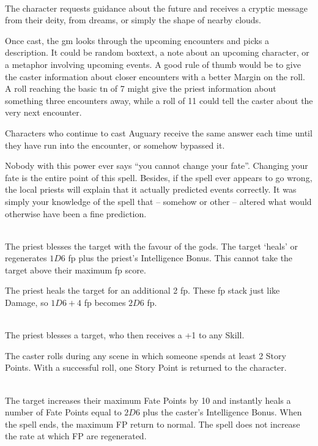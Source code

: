 \documentclass[titlepage,a4paper,openany]{book}
\begin{document}
\begin{multicols}{2}
\spelllevel

\\
The character requests guidance about the future and receives a cryptic message from their deity, from dreams, or simply the shape of nearby clouds.

Once cast, the \gls{gm} looks through the upcoming encounters and picks a description.  It could be random boxtext, a note about an upcoming character, or a metaphor involving upcoming events.  A good rule of thumb would be to give the caster information about closer encounters with a better Margin on the roll.  A roll reaching the basic \gls{tn} of 7 might give the priest information about something three encounters away, while a roll of 11 could tell the caster about the very next encounter.

Characters who continue to cast Auguary receive the same answer each time until they have run into the encounter, or somehow bypassed it.

Nobody with this power ever says ``you cannot change your fate''.  Changing your fate is the entire point of this spell.  Besides, if the spell ever appears to go wrong, the local priests will explain that it actually predicted events correctly.  It was simply your knowledge of the spell that -- somehow or other -- altered what would otherwise have been a fine prediction.

\\
The priest blesses the target with the favour of the gods. The target `heals' or regenerates $1D6$ \gls{fp} plus the priest's Intelligence Bonus. This cannot take the target above their maximum \gls{fp} score.


The priest heals the target for an additional 2 \gls{fp}.  These \gls{fp} stack just like Damage, so $1D6+4$ \gls{fp} becomes $2D6$ \gls{fp}.

\spelllevel

\\
The priest blesses a target, who then receives a +1 to any Skill.

The caster rolls during any scene in which someone spends at least 2 Story Points.  With a successful roll, one Story Point is returned to the character.

\spelllevel

\\
The target increases their maximum Fate Points by 10 and instantly heals a number of Fate Points equal to $2D6$ plus the caster's Intelligence Bonus. When the spell ends, the maximum FP return to normal. The spell does not increase the rate at which FP are regenerated.


\end{multicols}
\end{document}
